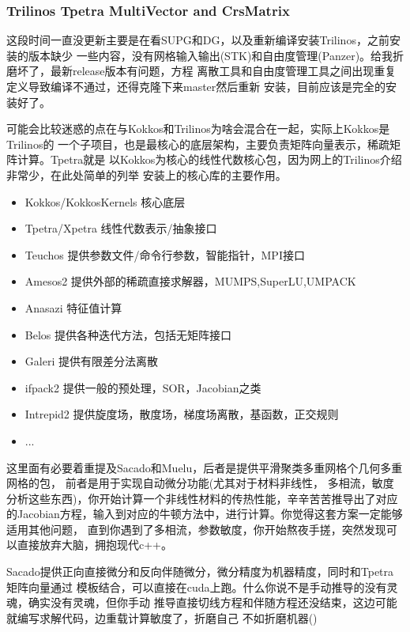 \subsubsection{Trilinos Tpetra MultiVector and CrsMatrix}
这段时间一直没更新主要是在看SUPG和DG，以及重新编译安装Trilinos，之前安装的版本缺少
一些内容，没有网格输入输出(STK)和自由度管理(Panzer)。给我折磨坏了，最新release版本有问题，方程
离散工具和自由度管理工具之间出现重复定义导致编译不通过，还得克隆下来master然后重新
安装，目前应该是完全的安装好了。

可能会比较迷惑的点在与Kokkos和Trilinos为啥会混合在一起，实际上Kokkos是Trilinos的
一个子项目，也是最核心的底层架构，主要负责矩阵向量表示，稀疏矩阵计算。Tpetra就是
以Kokkos为核心的线性代数核心包，因为网上的Trilinos介绍非常少，在此处简单的列举
安装上的核心库的主要作用。

\begin{itemize}
    \item Kokkos/KokkosKernels 核心底层
    \item Tpetra/Xpetra        线性代数表示/抽象接口
    \item Teuchos              提供参数文件/命令行参数，智能指针，MPI接口
    \item Amesos2              提供外部的稀疏直接求解器，MUMPS,SuperLU,UMPACK
    \item Anasazi              特征值计算
    \item Belos                提供各种迭代方法，包括无矩阵接口
    \item Galeri               提供有限差分法离散
    \item ifpack2              提供一般的预处理，SOR，Jacobian之类
    \item Intrepid2            提供旋度场，散度场，梯度场离散，基函数，正交规则
    \item ...  
\end{itemize}

这里面有必要着重提及Sacado和Muelu，后者是提供平滑聚类多重网格个几何多重网格的包，
前者是用于实现自动微分功能(尤其对于材料非线性，
多相流，敏度分析这些东西)，你开始计算一个非线性材料的传热性能，辛辛苦苦推导出了对应
的Jacobian方程，输入到对应的牛顿方法中，进行计算。你觉得这套方案一定能够适用其他问题，
直到你遇到了多相流，参数敏度，你开始熬夜手搓，突然发现可以直接放弃大脑，拥抱现代c++。

Sacado提供正向直接微分和反向伴随微分，微分精度为机器精度，同时和Tpetra矩阵向量通过
模板结合，可以直接在cuda上跑。什么你说不是手动推导的没有灵魂，确实没有灵魂，但你手动
推导直接切线方程和伴随方程还没结束，这边可能就编写求解代码，边重载计算敏度了，折磨自己
不如折磨机器()

